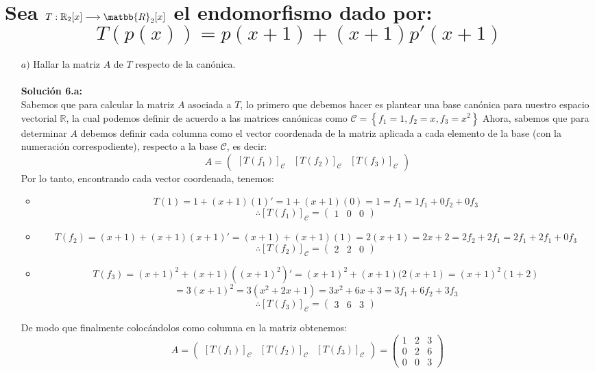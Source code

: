\section{Sea \textbf{$T: \mathbb{R}_2[x] \longrightarrow \matbb{R}_2[x]$} el endomorfismo dado por:
\[T(p(x)) = p(x+1)+(x+1)p'(x+1)\]}
\begin{itemize}
    \item[$a)$] Hallar la matriz $A$ de $T$ respecto de la can\'onica.\\\\
    \textbf{Soluci\'on 6.a:}\\
    Sabemos que para calcular la matriz $A$ asociada a $T$, lo primero que debemos hacer es plantear una base can\'onica para nuestro espacio vectorial $\mathbb{R}$, la cual podemos definir de acuerdo a las matrices can\'onicas como $\mathcal{C}=\left\{f_1=1, f_2=x, f_3=x^2\right\}$ Ahora, sabemos que para determinar $A$ debemos definir cada columna como el vector coordenada de la matriz aplicada a cada elemento de la base (con la numeraci\'on correspodiente), respecto a la base $\mathcal{C}$, es decir:
    \[A=\begin{pmatrix} [T(f_1)]_{\mathcal{C}} & [T(f_2)]_{\mathcal{C}} &[T(f_3)]_{\mathcal{C}}\end{pmatrix}\]
    Por lo tanto, encontrando cada vector coordenada, tenemos:
    \begin{itemize}
        \item \[T(1)=1+(x+1)(1)'=1+(x+1)(0)=1=f_1=1f_1+0f_2+0f_3\]
    \[\therefore [T(f_1)]_{\mathcal{C}}=\begin{pmatrix} 1 & 0 & 0\end{pmatrix}\]
    
    \item \[T(f_2)=(x+1)+(x+1)(x+1)'=(x+1)+(x+1)(1)=2(x+1)=2x+2=2f_2+2f_1=2f_1+2f_1+0f_3\]
    \[\therefore [T(f_2)]_{\mathcal{C}}=\begin{pmatrix} 2 & 2 & 0\end{pmatrix}\]
    
    \item \[T(f_3)=(x+1)^2+(x+1)((x+1)^2)'=(x+1)^2+(x+1)(2(x+1)=(x+1)^2(1+2)\]\[=3(x+1)^2=3(x^2+2x+1)=3x^2+6x+3=3f_1+6f_2+3f_3\]
    \[\therefore [T(f_3)]_{\mathcal{C}}=\begin{pmatrix} 3 & 6 & 3\end{pmatrix}\]
    
    \end{itemize}De modo que finalmente coloc\'andolos como columna en la matriz obtenemos:
    \[A= \begin{pmatrix} [T(f_1)]_{\mathcal{C}} & [T(f_2)]_{\mathcal{C}} &[T(f_3)]_{\mathcal{C}}\end{pmatrix}=\begin{pmatrix}
    1 & 2 & 3\\
    0 & 2 & 6\\
    0 & 0 & 3\end{pmatrix}\]
    

\end{itemize}
